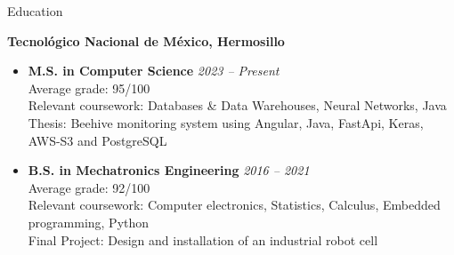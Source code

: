 \begin{rSection}{Education}
    \raggedright
    {\large \textbf{Tecnológico Nacional de México, Hermosillo}} \hfill  \\
    \begin{itemize}[label={}]
        \item \textbf{M.S. in Computer Science} \hfill \textit{2023 -- Present} \\
              \hspace{1.5em}Average grade: 95/100 \\
              \hspace{1.5em}Relevant coursework: Databases \& Data Warehouses, Neural Networks, Java \\
              \hspace{1.5em}Thesis: Beehive monitoring system using Angular, Java, FastApi, Keras, AWS-S3 and PostgreSQL \\

              \vspace{0.5em}
        \item \textbf{B.S. in Mechatronics Engineering} \hfill \textit{2016 -- 2021} \\
              \hspace{1.5em}Average grade: 92/100 \\
              \hspace{1.5em}Relevant coursework: Computer electronics, Statistics, Calculus, Embedded programming, Python \\
              \hspace{1.5em}Final Project: Design and installation of an industrial robot cell  \\
    \end{itemize}
\end{rSection}

